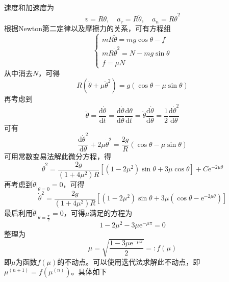 \begin{solution}
速度和加速度为
\begin{equation*}
	v = R\dot{\theta},\quad a_\tau = R\ddot{\theta},\quad a_n = R\dot{\theta}^2
\end{equation*}
根据Newton第二定律以及摩擦力的关系，可有方程组
\begin{equation*}
	\begin{cases}
		mR\ddot{\theta} = mg\cos \theta - f \\
		mR\dot{\theta}^2 = N-mg\sin \theta \\
		f = \mu N
	\end{cases}
\end{equation*}
从中消去$N$，可得
\begin{equation*}
	R(\ddot{\theta} + \mu\dot{\theta}^2) = g(\cos \theta - \mu\sin \theta)
\end{equation*}
再考虑到
\begin{equation*}
	\ddot{\theta} = \frac{\mathrm{d} \dot{\theta}}{\mathrm{d} t} = \frac{\mathrm{d} \dot{\theta}}{\mathrm{d} \theta} \frac{\mathrm{d} \theta}{\mathrm{d} t} = \dot{\theta} \frac{\mathrm{d} \dot{\theta}}{\mathrm{d} \theta} = \frac12 \frac{\mathrm{d} \dot{\theta}^2}{\mathrm{d} \theta}
\end{equation*}
可有
\begin{equation*}
	\frac{\mathrm{d} \dot{\theta}^2}{\mathrm{d} \theta} + 2\mu\dot{\theta}^2 = \frac{2g}{R}(\cos \theta - \mu\sin \theta)
\end{equation*}
可用常数变易法解此微分方程，得
\begin{equation*}
	\dot{\theta}^2 = \frac{2g}{(1+4\mu^2)R} \left[(1-2\mu^2)\sin \theta + 3\mu \cos \theta\right] + C\mathrm{e}^{-2\mu\theta}
\end{equation*}
再考虑到$\dot{\theta}\big|_{\theta=0} = 0$，可得
\begin{equation*}
	\dot{\theta}^2 = \frac{2g}{(1+4\mu^2)R} \left[(1-2\mu^2)\sin \theta + 3\mu (\cos \theta-\mathrm{e}^{-2\mu\theta})\right]
\end{equation*}
最后利用$\dot{\theta}\big|_{\theta=\frac{\pi}{2}} = 0$，可得$\mu$满足的方程为
\begin{equation*}
	1-2\mu^2-3\mu\mathrm{e}^{-\mu\pi} = 0
\end{equation*}
整理为
\begin{equation*}
	\mu = \sqrt{\frac{1-3\mu\mathrm{e}^{-\mu\pi}}{2}} =: f(\mu)
\end{equation*}
即$\mu$为函数$f(\mu)$的不动点。可以使用迭代法求解此不动点，即$\mu^{(n+1)} = f(\mu^{(n)})$。具体如下

\end{solution}
